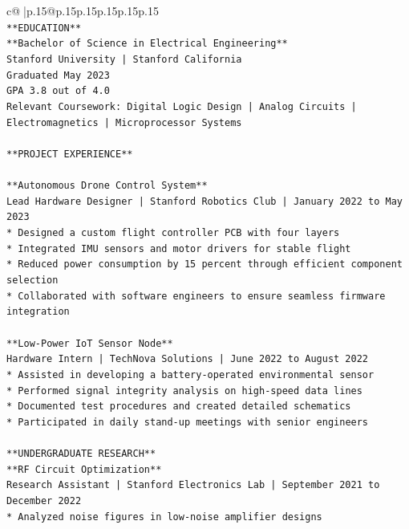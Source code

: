 \documentclass{article}
\begin{document}
{\begin{supertabular}{c@{$\;$}|p{.15\linewidth}@{}p{.15\linewidth}p{.15\linewidth}p{.15\linewidth}p{.15\linewidth}p{.15\linewidth}}
{{{\\ 
\texttt{**EDUCATION**} \\
\texttt{**Bachelor of Science in Electrical Engineering**} \\
\texttt{Stanford University | Stanford California} \\
\texttt{Graduated May 2023} \\
\texttt{GPA 3.8 out of 4.0} \\
\texttt{Relevant Coursework: Digital Logic Design | Analog Circuits | Electromagnetics | Microprocessor Systems} \\
\\ 
\texttt{**PROJECT EXPERIENCE**} \\
\\ 
\texttt{**Autonomous Drone Control System**} \\
\texttt{Lead Hardware Designer | Stanford Robotics Club | January 2022 to May 2023} \\
\texttt{*   Designed a custom flight controller PCB with four layers} \\
\texttt{*   Integrated IMU sensors and motor drivers for stable flight} \\
\texttt{*   Reduced power consumption by 15 percent through efficient component selection} \\
\texttt{*   Collaborated with software engineers to ensure seamless firmware integration} \\
\\ 
\texttt{**Low{-}Power IoT Sensor Node**} \\
\texttt{Hardware Intern | TechNova Solutions | June 2022 to August 2022} \\
\texttt{*   Assisted in developing a battery{-}operated environmental sensor} \\
\texttt{*   Performed signal integrity analysis on high{-}speed data lines} \\
\texttt{*   Documented test procedures and created detailed schematics} \\
\texttt{*   Participated in daily stand{-}up meetings with senior engineers} \\
\\ 
\texttt{**UNDERGRADUATE RESEARCH**} \\
\texttt{**RF Circuit Optimization**} \\
\texttt{Research Assistant | Stanford Electronics Lab | September 2021 to December 2022} \\
\texttt{*   Analyzed noise figures in low{-}noise amplifier designs} \\
}}}
\end{supertabular}}
\end{document}
